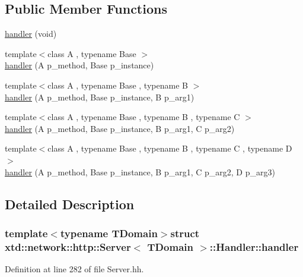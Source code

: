 \subsection*{Public Member Functions}
\begin{DoxyCompactItemize}
\item 
\hyperlink{structxtd_1_1network_1_1http_1_1Server_1_1Handler_1_1handler_a8e556b76c51c74bc4b16517849fdcafd}{handler} (void)
\item 
{\footnotesize template$<$class A , typename Base $>$ }\\\hyperlink{structxtd_1_1network_1_1http_1_1Server_1_1Handler_1_1handler_a0bedae8aec5d715b9b0cd8e9082099e8}{handler} (A p\-\_\-method, Base p\-\_\-instance)
\item 
{\footnotesize template$<$class A , typename Base , typename B $>$ }\\\hyperlink{structxtd_1_1network_1_1http_1_1Server_1_1Handler_1_1handler_a089483dc14d092c62de9c5dd4cb43e47}{handler} (A p\-\_\-method, Base p\-\_\-instance, B p\-\_\-arg1)
\item 
{\footnotesize template$<$class A , typename Base , typename B , typename C $>$ }\\\hyperlink{structxtd_1_1network_1_1http_1_1Server_1_1Handler_1_1handler_aa7c23fa55485cff7c30348ff7ccdb344}{handler} (A p\-\_\-method, Base p\-\_\-instance, B p\-\_\-arg1, C p\-\_\-arg2)
\item 
{\footnotesize template$<$class A , typename Base , typename B , typename C , typename D $>$ }\\\hyperlink{structxtd_1_1network_1_1http_1_1Server_1_1Handler_1_1handler_a888845347fd22039dca6332340c0f79a}{handler} (A p\-\_\-method, Base p\-\_\-instance, B p\-\_\-arg1, C p\-\_\-arg2, D p\-\_\-arg3)
\end{DoxyCompactItemize}


\subsection{Detailed Description}
\subsubsection*{template$<$typename T\-Domain$>$struct xtd\-::network\-::http\-::\-Server$<$ T\-Domain $>$\-::\-Handler\-::handler}



Definition at line 282 of file Server.\-hh.



